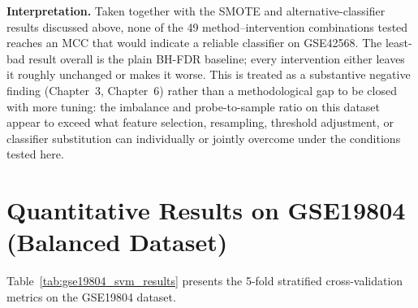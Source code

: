\textbf{\textsf{Interpretation.}} Taken together with the SMOTE and alternative-classifier results discussed above, none of the 49 method--intervention combinations tested reaches an MCC that would indicate a reliable classifier on GSE42568. The least-bad result overall is the plain BH-FDR baseline; every intervention either leaves it roughly unchanged or makes it worse. This is treated as a substantive negative finding (Chapter~3, Chapter~6) rather than a methodological gap to be closed with more tuning: the imbalance and probe-to-sample ratio on this dataset appear to exceed what feature selection, resampling, threshold adjustment, or classifier substitution can individually or jointly overcome under the conditions tested here.

\medskip


\section{Quantitative Results on GSE19804 (Balanced Dataset)}

Table~\ref{tab:gse19804_svm_results} presents the 5-fold stratified cross-validation metrics on the GSE19804 dataset.

\begin{table}[H]
\centering
\caption{5-Fold Stratified Cross-Validation performance on GSE19804 using $p \le 0.05$ selection.}
\label{tab:gse19804_svm_results}
\small
{}
\end{table}

